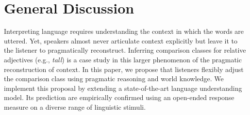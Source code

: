 \documentclass[doc, floatsintext]{apa6}
\newcommand{\red}[1]{\textcolor{Red}{#1}}
\begin{document}
\section{General Discussion}



%
%
%
%
%
%
%
%
%
%














Interpreting language requires understanding the context in which the words are uttered.
Yet, speakers almost never articulate context explicitly but leave it to the listener to pragmatically reconstruct.
Inferring comparison classes for relative adjectives (e.g., \emph{tall}) is a case study in this larger phenomenon of the pragmatic reconstruction of context.
In this paper, we propose that listeners flexibly adjust the comparison class using pragmatic reasoning and world knowledge. 
We implement this proposal by extending a state-of-the-art language understanding model. Its prediction are empirically confirmed using an open-ended response measure on a diverse range of linguistic stimuli.
\end{document}
